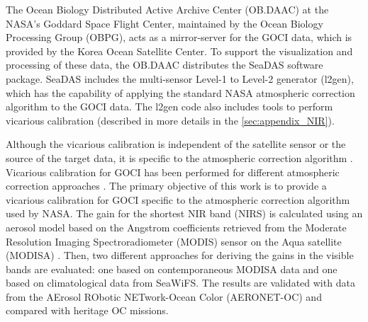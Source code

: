 \documentclass[]{interact}
\theoremstyle{plain}%
\theoremstyle{definition}
\theoremstyle{remark}
\begin{document}
The Ocean Biology Distributed Active Archive Center (OB.DAAC) at the NASA's Goddard Space Flight Center, maintained by the Ocean Biology Processing Group (OBPG), acts as a mirror-server for the GOCI data, which is provided by the Korea Ocean Satellite Center.  To support the visualization and processing of these data, the OB.DAAC distributes the SeaDAS software package.  SeaDAS includes the multi-sensor Level-1 to Level-2 generator (l2gen), which has the capability of applying the standard NASA atmospheric correction algorithm to the GOCI data. The l2gen code also includes tools to perform vicarious calibration (described in more details in the \autoref{sec:appendix_NIR}). 

Although the vicarious calibration is independent of the satellite sensor or the source of the target data, it is specific to the atmospheric correction algorithm \citep{Franz:07}. Vicarious calibration for GOCI has been performed for different atmospheric correction approaches \citep{Ahn2015,Wang:13}. The primary objective of this work is to provide a vicarious calibration for GOCI specific to the atmospheric correction algorithm used by NASA. The gain for the shortest NIR band (NIRS) is calculated using an aerosol model based on the Angstrom coefficients retrieved from the Moderate Resolution Imaging Spectroradiometer (MODIS) sensor on the Aqua satellite (MODISA) \citep{Esaias1998}. Then, two different approaches for deriving the gains in the visible bands are evaluated: one based on contemporaneous MODISA data and one based on climatological data from SeaWiFS. The results are validated with data from the AErosol RObotic NETwork-Ocean Color (AERONET-OC) \citep{Zibordi2009} and compared with heritage OC missions. 

\end{document}
